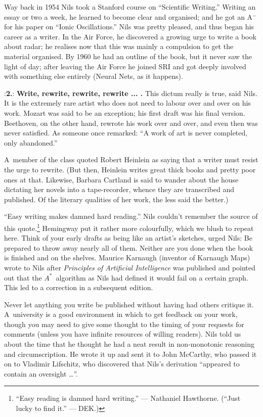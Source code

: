\smallskip
   Way back in 1954 Nils took a Stanford course on ``Scientific Writing.'' Writing
   an essay or two a week, he learned to become clear and organised; and
   he got an A$^-$ for his paper on ``Ionic Oscillations.'' Nils was pretty
   pleased, and thus began his career as a writer.  In the Air Force,
   he   discovered a growing urge to write a book about radar;  he
   realises now that this was mainly a compulsion to get the material
   organised. By 1960 he had an outline of the book, but it
   never saw the light of day; after leaving the Air Force he joined SRI
   and got deeply involved with something else entirely (Neural Nets, as
   it happens).

\smallskip
\display 20pt:{\bf 2.}:
{\bf Write, rewrite, rewrite, rewrite .\thinspace.\thinspace.  \thinspace .} \quad
This dictum  really is true,
said Nils.  It is the extremely rare artist who does not need to
labour over and over on his work. Mozart was said to be an exception;
his first draft was his final version. Beethoven, on the other hand,
rewrote his work over and over, and even then was never satisfied. As
someone once remarked: ``A work of art is never completed, only
abandoned.'' 

A~member of the class quoted Robert Heinlein as saying
that a writer must resist the urge to rewrite. (But then, Heinlein writes
great thick books and pretty poor ones at that.  Likewise, Barbara
Cartland is said to wander about the house dictating her novels into
a tape-recorder, whence they are transcribed and published. Of the
literary qualities of her work, the less said the better.)

\smallskip
``Easy writing makes damned hard reading.'' Nils couldn't remember the
source of this quote.\footnote*{``Easy reading is damned hard writing.''
--- Nathaniel Hawthorne. (``Just lucky to
find it.'' --- DEK.)}
Hemingway put it rather more colourfully, which
we blush to repeat here. Think of your early drafts as being like an
artist's sketches, urged Nils: Be prepared to throw away nearly all of
them.  Neither are you done when the book is finished and on the
shelves. Maurice Karnaugh (inventor of Karnaugh Maps) wrote to Nils
after {\sl Principles of Artificial Intelligence\/} was published and
pointed out that the $A^{\ast}$~algorithm as Nils had defined it would fail on
a certain graph. This led to a correction in a subsequent edition.

Never let anything you write be published without having had others
critique it. A~university is a good environment in which to get
feedback on your work, though you may need to give some thought to the
timing of your requests for comments (unless you have infinite
resources of willing readers). Nils told us about the time that he
thought he had a neat result in non-monotonic reasoning and
circumscription. He wrote it up and sent it to John McCarthy, who
passed it on to Vladimir Lifschitz, who discovered that Nils's
derivation ``appeared to contain an oversight \dots''.

